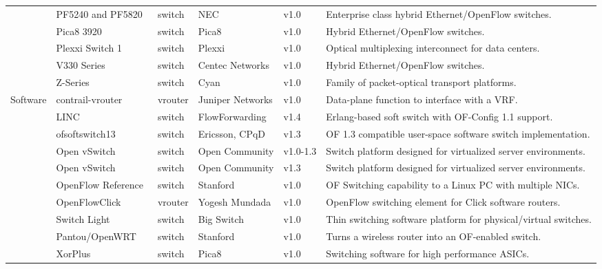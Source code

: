 {\begin{table}[!htp]
\begin{center}
\begin{tabularx}{\linewidth}{p{1.1cm}p{3.1cm}p{0.9cm}p{2.4cm}p{0.95cm}X}
& PF5240 and PF5820~\cite{nec2013-2} & switch & NEC & v1.0 & Enterprise class hybrid Ethernet/OpenFlow switches. \\\cline{2-6}
& Pica8 3920~\cite{pica8opennetworking2013} & switch & Pica8 & v1.0 & Hybrid Ethernet/OpenFlow switches. \\\cline{2-6}
& Plexxi Switch 1~\cite{plexxi2013} & switch & Plexxi & v1.0 & Optical multiplexing interconnect for data centers. \\\cline{2-6}
& V330 Series~\cite{centecnetworks2013} & switch & Centec Networks & v1.0 & Hybrid Ethernet/OpenFlow switches. \\\cline{2-6}
& Z-Series~\cite{cyan2013} & switch & Cyan & v1.0 & Family of packet-optical transport platforms.\\
\hline
\multirow{9}{*}{Software} 
& contrail-vrouter~\cite{networks2013} & vrouter &  Juniper Networks & v1.0 & Data-plane function to interface with a VRF.\\\cline{2-6}
& LINC~\cite{flowforwarding2013,rutka2013} & switch &  FlowForwarding & v1.4 & Erlang-based soft switch with OF-Config 1.1 support.\\\cline{2-6}
& ofsoftswitch13~\cite{cpqd2013} & switch & Ericsson, CPqD & v1.3 & OF 1.3 compatible user-space software switch implementation. \\\cline{2-6}
<<<<<<< HEAD
& Open vSwitch~\cite{listofcontributors2013,pfaff2009} & switch & Open Community & v1.0-1.3  & Switch platform designed for virtualized server environments.  \\\cline{2-6}
=======
& Open vSwitch~\cite{listofcontributors2013,pfaff2009} & switch & Open Community & v1.3  & Switch platform designed for virtualized server environments.  \\\cline{2-6}
>>>>>>> cf0efb14a6b582e806c087b3fa412b9afb5290e3
& OpenFlow Reference~\cite{openflowcommunity2009} & switch & Stanford & v1.0 & OF Switching capability to a Linux PC with multiple NICs. \\\cline{2-6}
& OpenFlowClick~\cite{mundada2009} & vrouter & Yogesh Mundada & v1.0 & OpenFlow switching element for Click software routers.\\\cline{2-6}
& Switch Light~\cite{bigswitchnetworks2013} & switch & Big Switch & v1.0  & Thin switching software platform for physical/virtual switches. \\\cline{2-6}
& Pantou/OpenWRT~\cite{yiakoumis2011} & switch & Stanford  & v1.0 & Turns a wireless router into an OF-enabled switch. \\\cline{2-6}
& XorPlus~\cite{shang2014} & switch &  Pica8 & v1.0 & Switching software for high performance ASICs.\\
\hline
\end{tabularx}
\end{center}
\end{table}
}
